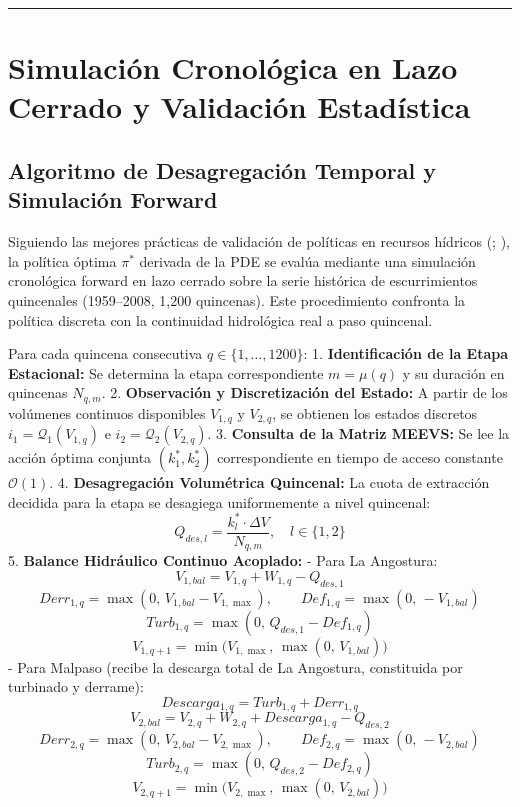 \documentclass[
  spanish,
  letterpaper,
]{scrreprt}
\theoremstyle{definition}
\theoremstyle{remark}
\begin{document}
\begin{center}\rule{0.5\linewidth}{0.5pt}\end{center}

\section{Simulación Cronológica en Lazo Cerrado y Validación
Estadística}\label{simulaciuxf3n-cronoluxf3gica-en-lazo-cerrado-y-validaciuxf3n-estaduxedstica}

\subsection{Algoritmo de Desagregación Temporal y Simulación
Forward}\label{algoritmo-de-desagregaciuxf3n-temporal-y-simulaciuxf3n-forward}

Siguiendo las mejores prácticas de validación de políticas en recursos
hídricos (;
), la política
óptima \(\pi^*\) derivada de la PDE se evalúa mediante una simulación
cronológica forward en lazo cerrado sobre la serie histórica de
escurrimientos quincenales (1959--2008, 1,200 quincenas). Este
procedimiento confronta la política discreta con la continuidad
hidrológica real a paso quincenal.

Para cada quincena consecutiva \(q \in \{1, \dots, 1200\}\): 1.
\textbf{Identificación de la Etapa Estacional:} Se determina la etapa
correspondiente \(m = \mu(q)\) y su duración en quincenas \(N_{q,m}\).
2. \textbf{Observación y Discretización del Estado:} A partir de los
volúmenes continuos disponibles \(V_{1,q}\) y \(V_{2,q}\), se obtienen
los estados discretos \(i_1 = \mathcal{Q}_1(V_{1,q})\) e
\(i_2 = \mathcal{Q}_2(V_{2,q})\). 3. \textbf{Consulta de la Matriz
MEEVS:} Se lee la acción óptima conjunta \((k_1^*, k_2^*)\)
correspondiente en tiempo de acceso constante \(\mathcal{O}(1)\). 4.
\textbf{Desagregación Volumétrica Quincenal:} La cuota de extracción
decidida para la etapa se desagiega uniformemente a nivel quincenal:
\[Q_{des,l} = \frac{k_l^* \cdot \Delta V}{N_{q,m}}, \quad l \in \{1, 2\}\]
5. \textbf{Balance Hidráulico Continuo Acoplado:} - Para La Angostura:
\[V_{1,bal} = V_{1,q} + W_{1,q} - Q_{des,1}\]
\[Derr_{1,q} = \max(0, \, V_{1,bal} - V_{1,\max}), \qquad Def_{1,q} = \max(0, \, -V_{1,bal})\]
\[Turb_{1,q} = \max(0, \, Q_{des,1} - Def_{1,q})\]
\[V_{1,q+1} = \min\big(V_{1,\max}, \, \max(0, \, V_{1,bal})\big)\] -
Para Malpaso (recibe la descarga total de La Angostura, constituida por
turbinado y derrame): \[Descarga_{1,q} = Turb_{1,q} + Derr_{1,q}\]
\[V_{2,bal} = V_{2,q} + W_{2,q} + Descarga_{1,q} - Q_{des,2}\]
\[Derr_{2,q} = \max(0, \, V_{2,bal} - V_{2,\max}), \qquad Def_{2,q} = \max(0, \, -V_{2,bal})\]
\[Turb_{2,q} = \max(0, \, Q_{des,2} - Def_{2,q})\]
\[V_{2,q+1} = \min\big(V_{2,\max}, \, \max(0, \, V_{2,bal})\big)\]
\end{document}
